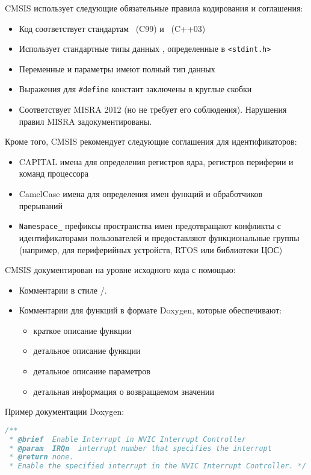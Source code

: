 \pagebreak
{}

\noindent
CMSIS использует следующие обязательные правила кодирования и соглашения:
\begin{itemize}[nosep]
  \item 
Код соответствует стандартам \anC\ (C99) и \cpp\ (C++03)
  \item 
Использует стандартные типы данных \anC, определенные в \verb|<stdint.h>|
  \item 
Переменные и параметры имеют полный тип данных
  \item 
Выражения для \verb|#define| констант заключены в круглые скобки 
  \item
Соответствует MISRA 2012 (но не требует его соблюдения). Нарушения правил
MISRA задокументированы.
\end{itemize}

\noindent
Кроме того, CMSIS рекомендует следующие соглашения для идентификаторов:

\begin{itemize}[nosep]
  \item 
CAPITAL имена для определения регистров ядра, регистров периферии и команд процессора
  \item 
CamelCase имена для определения имен функций и обработчиков прерываний
  \item 
\verb|Namespace_| префиксы пространства имен предотвращают конфликты с
идентификаторами пользователей и предоставляют функциональные группы (например,
для периферийных устройств, RTOS или библиотеки ЦОС)
\end{itemize}
 
\noindent
CMSIS документирован на уровне исходного кода с помощью:

\begin{itemize}[nosep]
  \item 
Комментарии в стиле \purec/\cpp. 
  \item 
Комментарии для функций в формате Doxygen, которые обеспечивают:
\begin{itemize}[nosep]
  \item 
краткое описание функции
  \item 
детальное описание функции
  \item 
детальное описание параметров
  \item 
детальная информация о возвращаемом значении 
\end{itemize}
\end{itemize}

\noindent
Пример документации Doxygen:

\begin{lstlisting}[language=C]
/** 
 * @brief  Enable Interrupt in NVIC Interrupt Controller
 * @param  IRQn  interrupt number that specifies the interrupt
 * @return none.
 * Enable the specified interrupt in the NVIC Interrupt Controller. */
\end{lstlisting}
